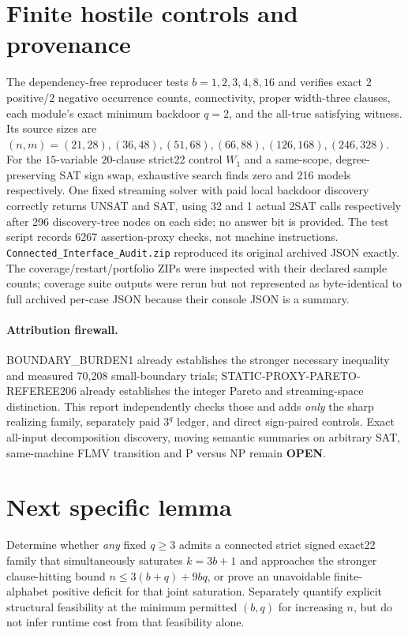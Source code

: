 \documentclass[11pt]{article}
\begin{document}
\section{Finite hostile controls and provenance}
The dependency-free reproducer tests $b=1,2,3,4,8,16$ and verifies exact $2$ positive/$2$ negative occurrence counts, connectivity, proper width-three clauses, each module's exact minimum backdoor $q=2$, and the all-true satisfying witness. Its source sizes are $(n,m)=(21,28),(36,48),(51,68),(66,88),(126,168),(246,328)$. For the $15$-variable $20$-clause strict22 control $W_1$ and a same-scope, degree-preserving SAT sign swap, exhaustive search finds zero and 216 models respectively. One fixed streaming solver with paid local backdoor discovery correctly returns UNSAT and SAT, using 32 and 1 actual 2SAT calls respectively after 296 discovery-tree nodes on each side; no answer bit is provided. The test script records 6267 assertion-proxy checks, not machine instructions. \texttt{Connected\_Interface\_Audit.zip} reproduced its original archived JSON exactly. The coverage/restart/portfolio ZIPs were inspected with their declared sample counts; coverage suite outputs were rerun but not represented as byte-identical to full archived per-case JSON because their console JSON is a summary.

\paragraph{Attribution firewall.} BOUNDARY\_BURDEN1 already establishes the stronger necessary inequality and measured 70,208 small-boundary trials; STATIC-PROXY-PARETO-REFEREE206 already establishes the integer Pareto and streaming-space distinction. This report independently checks those and adds \emph{only} the sharp realizing family, separately paid $3^q$ ledger, and direct sign-paired controls. Exact all-input decomposition discovery, moving semantic summaries on arbitrary SAT, same-machine FLMV transition and P versus NP remain \textbf{OPEN}.

\section{Next specific lemma}
Determine whether \emph{any} fixed $q\ge3$ admits a connected strict signed exact22 family that simultaneously saturates $k=3b+1$ and approaches the stronger clause-hitting bound $n\le3(b+q)+9bq$, or prove an unavoidable finite-alphabet positive deficit for that joint saturation. Separately quantify explicit structural feasibility at the minimum permitted $(b,q)$ for increasing $n$, but do not infer runtime cost from that feasibility alone.
\end{document}

